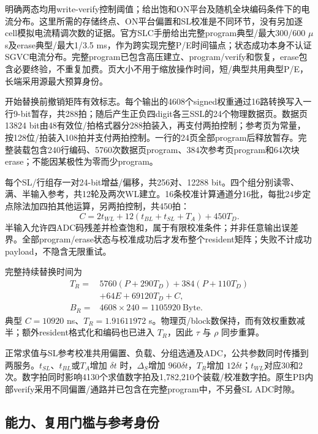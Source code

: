 明确两态均用write-verify控制阈值；给出饱和ON平台及随机全块编码条件下的电流分布。这里所需的存储终点、ON平台偏置和SL校准是不同环节，没有另加逐cell模拟电流精调次数的证据。官方SLC手册给出完整program典型/最大300/600 $\mu$s及erase典型/最大1/3.5 ms，作为跨实现完整P/E时间锚点；状态成功本身不认证SGVC电流分布。完整program已包含高压建立、program/verify和恢复，erase包含必要终验，不重复加费。页大小不用于缩放操作时间，短/典型共用典型P/E，长端采用源最大预算身份。
\cite{nand04,nand05,nand06,nand02}

开始替换前撤销矩阵有效标志。每个输出的4608个signed权重通过16路转换写入一行9-bit暂存，共288拍；随后产生正负四digit各三SSL的24个物理数据页。数据页13824 bit由48有效位/拍格式器分288拍装入，再支付两拍控制；参考页为常量，按128位/拍装入108拍并支付两拍控制。一行的24页全部program后释放暂存。完整装载包含240行编码、5760次数据页program、384次参考页program和64次块erase；不能因某极性为零而少program。

每个SL/行组存一对24-bit增益/偏移，共256对、12288 bit。四个组分别读零、满、半输入参考，共12轮及两次WL建立。16条校准计算通道分16批，每批24步定点除法加四拍其他运算，另两拍控制，共450拍：
\[
 C=2t_{WL}+12(t_{BL}+t_{SL}+T_A)+450T_D.
\]
半输入允许四ADC码残差并检查饱和，属于有限校准条件；并非任意输出误差界。全部program/erase状态与校准成功后才发布整个resident矩阵；失败不计成功payload，不隐含无限重试。

完整持续替换时间为
\begin{equation}
\begin{aligned}
 T_R={}&5760(P+290T_D)+384(P+110T_D)\\
       &+64E+69120T_D+C,\\
 B_R={}&4608\times240=1105920\ \mathrm{Byte}.
\end{aligned}
\label{04_nand_3d:eq:resident}
\end{equation}
典型 $C=10920$ ns、$T_R=1.91611972$ s。物理页/block数保持，而有效权重数减半；额外resident格式化和编码也已进入 $T_R$，因此 $\tau$ 与 $\rho$ 同步重算。

正常求值与SL参考校准共用偏置、负载、分组选通及ADC，公共参数同时传播到两服务。$t_{SL}$、$t_{BL}$或$T_A$增加 $\delta t$ 时，$\Delta_S$增加 $960\delta t$，$T_R$增加 $12\delta t$；$t_{WL}$对应30和2次。数字拍同时影响4130个求值数字拍及1,782,210个装载/校准数字拍。原生PB内部verify采用不同偏置/通路并已包含在完整program中，不另叠SL ADC时隙。




\subsection{能力、复用门槛与参考身份}

